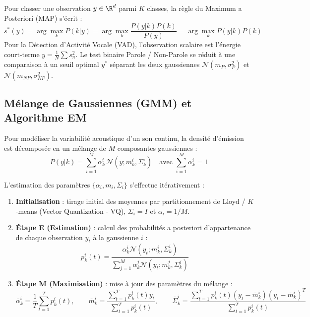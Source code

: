 Pour classer une observation $y \in \R^d$ parmi $K$ classes, la règle du Maximum a Posteriori (MAP) s'écrit :
\begin{equation}
    s^*(y) = \arg\max_{k} P(k|y) = \arg\max_{k} \frac{P(y|k) P(k)}{P(y)} = \arg\max_{k} P(y|k) P(k)
\end{equation}
Pour la Détection d'Activité Vocale (VAD), l'observation scalaire est l'énergie court-terme $y = \frac{1}{N} \sum s_n^2$. Le test binaire Parole / Non-Parole se réduit à une comparaison à un seuil optimal $y^*$ séparant les deux gaussiennes $\mathcal{N}(m_P, \sigma_P^2)$ et $\mathcal{N}(m_{NP}, \sigma_{NP}^2)$.

\subsection{Mélange de Gaussiennes (GMM) et Algorithme EM}

Pour modéliser la variabilité acoustique d'un son continu, la densité d'émission est décomposée en un mélange de $M$ composantes gaussiennes :
\begin{equation}
    P(y|k) = \sum_{i=1}^M \alpha_k^i \, \mathcal{N}\left(y; m_k^i, \Sigma_k^i\right) \quad \text{avec } \sum_{i=1}^M \alpha_k^i = 1
\end{equation}

\begin{theorem}
    L'estimation des paramètres $\{\alpha_i, m_i, \Sigma_i\}$ s'effectue itérativement :
    \begin{enumerate}
        \item \textbf{Initialisation} : tirage initial des moyennes par partitionnement de Lloyd / $K$-means (Vector Quantization - VQ), $\Sigma_i = I$ et $\alpha_i = 1/M$.
        \item \textbf{Étape E (Estimation)} : calcul des probabilités a posteriori d'appartenance de chaque observation $y_t$ à la gaussienne $i$ :
            \begin{equation}
                p_k^i(t) = \frac{\alpha_k^i \mathcal{N}\left(y_t; m_k^i, \Sigma_k^i\right)}{\displaystyle \sum_{j=1}^M \alpha_k^j \mathcal{N}\left(y_t; m_k^j, \Sigma_k^j\right)}
            \end{equation}
        \item \textbf{Étape M (Maximisation)} : mise à jour des paramètres du mélange :
            \begin{equation}
                \bar{\alpha}_k^i = \frac{1}{T} \sum_{t=1}^T p_k^i(t), \qquad \bar{m}_k^i = \frac{\displaystyle \sum_{t=1}^T p_k^i(t) y_t}{\displaystyle \sum_{t=1}^T p_k^i(t)}, \qquad \bar{\Sigma}_k^i = \frac{\displaystyle \sum_{t=1}^T p_k^i(t) (y_t - \bar{m}_k^i)(y_t - \bar{m}_k^i)^T}{\displaystyle \sum_{t=1}^T p_k^i(t)}
            \end{equation}
    \end{enumerate}
\end{theorem}

